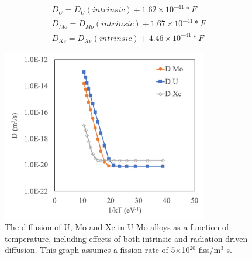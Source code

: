 \documentclass[review]{elsarticle}
\begin{document}
\begin{align}
 D_U = D_U(intrinsic) + 1.62\times10^{-41} * \dot{F} \label{eq3}  \\
 D_{Mo} = D_{Mo}(intrinsic) + 1.67\times10^{-41} * \dot{F} \label{eq4} \\
 D_{Xe} = D_{Xe}(intrinsic) + 4.46\times10^{-41} * \dot{F} \label{eq5}
\end{align}

\begin{figure}[h]
 \centering
 \includegraphics[width=0.8\textwidth]{total_diff.png} 
 \caption{The diffusion of U, Mo and Xe in U-Mo alloys as a function of temperature, including effects of both intrinsic and radiation driven diffusion. This graph assumes a fission rate of 5$\times$10$^{20}$ fiss/m$^3$-s.}
 \label{fig:totaldiff}
\end{figure}
\end{document}
